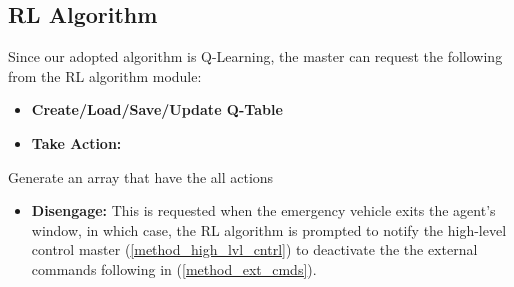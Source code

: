 \subsection{RL Algorithm}
    Since our adopted algorithm is Q-Learning, the master can request the following from the RL algorithm module:
        \begin{itemize}
            \item \textbf{Create/Load/Save/Update Q-Table}
            \item \textbf{Take Action:} 
            \end{itemize}
                \begin{algorithm}[H]
                \SetAlgoLined
                Generate an array that have the all actions\;
                \caption{Taking Action Algorithm}
            \end{algorithm}
            \begin{itemize}
            \item \textbf{Disengage:}
            This is requested when the emergency vehicle exits the agent’s window, in which case, the RL algorithm is prompted to notify the high-level control master (\ref{method_high_lvl_cntrl}) to deactivate the the external commands following in (\ref{method_ext_cmds}).
        \end{itemize}

